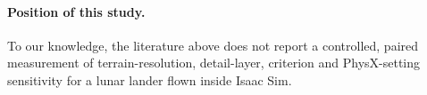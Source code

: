 \paragraph{Position of this study.}
To our knowledge, the literature above does not report a controlled, paired measurement of terrain-resolution, detail-layer, criterion and PhysX-setting sensitivity for a lunar lander flown inside Isaac Sim. 
